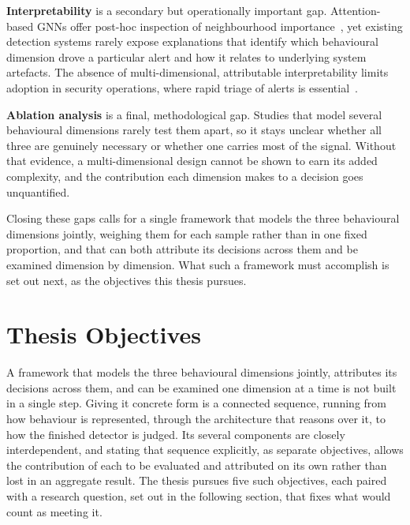 \documentclass[%
    BCOR=10mm,
    DIV=13,
    toc=bibliography,
    toc=listof,
    oneside,
    12pt,
]{scrbook}
\begin{document}
\textbf{Interpretability} is a secondary but operationally important gap.
Attention-based GNNs offer post-hoc inspection of
neighbourhood importance~\cite{velickovic2018gat, han2019}, yet existing
detection systems rarely expose explanations that identify which behavioural
dimension drove a particular alert and how it relates to underlying system
artefacts. The absence of multi-dimensional, attributable
interpretability limits adoption in security operations, where rapid triage
of alerts is essential~\cite{bilot2024survey}.

\textbf{Ablation analysis} is a final, methodological gap. Studies that model several
behavioural dimensions rarely test them apart, so it stays unclear whether all three
are genuinely necessary or whether one carries most of the signal. Without that
evidence, a multi-dimensional design cannot be shown to earn its added complexity,
and the contribution each dimension makes to a decision goes unquantified.

Closing these gaps calls for a single framework that models the three behavioural
dimensions jointly, weighing them for each sample rather than in one fixed
proportion, and that can both attribute its decisions across them and be
examined dimension by dimension. What such a framework must accomplish is set out
next, as the objectives this thesis pursues.

\endgroup

\section{Thesis Objectives}
\label{sec:objectives}

A framework that models the three behavioural dimensions jointly, attributes its
decisions across them, and can be examined one dimension at a time is not built in a
single step. Giving it concrete form is a connected sequence, running from how
behaviour is represented, through the architecture that reasons over it, to how the
finished detector is judged. Its several components are closely interdependent, and
stating that sequence explicitly, as separate objectives, allows the contribution of
each to be evaluated and attributed on its own rather than lost in an aggregate
result. The thesis pursues five such objectives, each paired with a research
question, set out in the following section, that fixes what would count as meeting
it.
\end{document}
